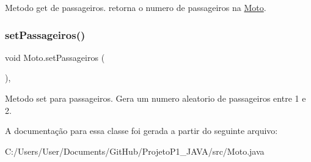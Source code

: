 Metodo get de passageiros. retorna o numero de passageiros na \mbox{\hyperlink{class_moto}{Moto}}. \mbox{\label{class_moto_a336f2ac21dee386aef726c3207b113f9}} 
\subsubsection{\texorpdfstring{set\+Passageiros()}{setPassageiros()}}
{\footnotesize\ttfamily void Moto.\+set\+Passageiros (\begin{DoxyParamCaption}{ }\end{DoxyParamCaption})\hspace{0.3cm}{\ttfamily [inline]}, {\ttfamily [private]}}

Metodo set para passageiros. Gera um numero aleatorio de passageiros entre 1 e 2. 

A documentação para essa classe foi gerada a partir do seguinte arquivo\+:\begin{DoxyCompactItemize}
\item 
C\+:/\+Users/\+User/\+Documents/\+Git\+Hub/\+Projeto\+P1\+\_\+\+J\+A\+V\+A/src/Moto.\+java\end{DoxyCompactItemize}
